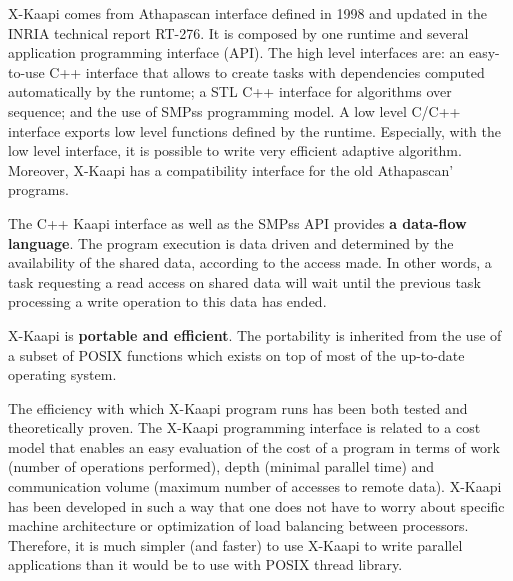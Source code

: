 \documentclass{report}[12pt]
\newcommand{\kaapi}{\textsc{X}-Kaapi\xspace}
\begin{document}
 \kaapi comes from Athapascan interface defined in 1998 and updated in the INRIA technical report RT-276.
It is composed by one runtime and several application programming interface (API). The high level interfaces are:  an easy-to-use C++ interface that allows to create tasks with dependencies computed automatically by the runtome; a STL C++ interface for algorithms over sequence; and the use of SMPss programming model. 
   A low level C/C++ interface exports low level functions defined by the runtime. Especially, with the low level interface, it is possible to write very efficient adaptive algorithm. Moreover, \kaapi has a compatibility interface for the old Athapascan' programs.

  The C++ Kaapi interface as well as the SMPss API provides \textbf{a data-flow language}.
  The program execution is data driven and determined by the availability of the shared data, 
  according to the access made. In other words, a task requesting a read access on shared data will  wait until the previous task processing a write operation to this data has ended. 

   \kaapi is \textbf{portable and efficient}.  
The portability is inherited from the use of a subset of POSIX functions which exists on top of most of the up-to-date operating system.

The efficiency with which \kaapi  program runs has been both tested and 
theoretically proven.  The \kaapi  programming interface is related to a cost model that enables an easy evaluation of the cost of a program in terms of work (number of operations performed), depth (minimal parallel time) and communication volume (maximum number of accesses to remote data). 
\kaapi  has been developed in such a way that one does not have to worry about specific machine architecture or optimization of load balancing between processors. 
Therefore, it is much simpler (and faster) to use \kaapi  to write parallel applications than it would be to use with POSIX thread library.

\end{document}
